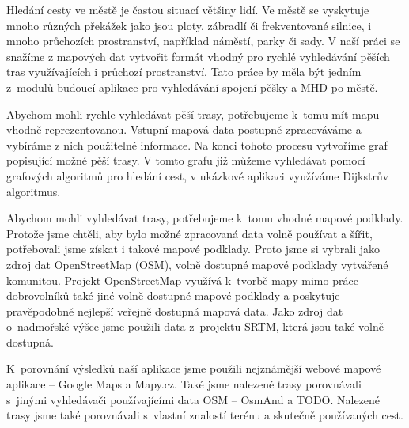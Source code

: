 
Hledání cesty ve městě je častou situací většiny lidí. Ve městě se vyskytuje
mnoho různých překážek jako jsou ploty, zábradlí či frekventované silnice,
i mnoho průchozích prostranství, například náměstí, parky či sady. V naší práci
se snažíme z mapových dat vytvořit formát vhodný pro rychlé vyhledávání pěších
tras využívajících i průchozí prostranství. Tato práce by měla být jedním z~modulů
budoucí aplikace pro vyhledávání spojení pěšky a MHD po městě. 

Abychom mohli rychle vyhledávat pěší trasy, potřebujeme k~tomu mít mapu vhodně
reprezentovanou. Vstupní mapová data postupně zpracováváme a vybíráme z nich
použitelné informace. Na konci tohoto procesu vytvoříme graf popisující možné
pěší trasy. V tomto grafu již můžeme vyhledávat pomocí grafových algoritmů pro
hledání cest, v ukázkové aplikaci využíváme Dijkstrův algoritmus. 

Abychom mohli vyhledávat trasy, potřebujeme k~tomu vhodné mapové podklady.
Protože jsme chtěli, aby bylo možné zpracovaná data volně používat a šířit, 
potřebovali jsme získat i takové mapové podklady. Proto jsme si vybrali jako
zdroj dat OpenStreetMap (OSM), volně dostupné mapové podklady vytvářené komunitou. 
Projekt OpenStreetMap využívá k~tvorbě mapy mimo práce dobrovolníků také jiné
volně dostupné mapové podklady a poskytuje pravěpodobně nejlepší veřejně
dostupná mapová data. Jako zdroj dat o~nadmořské výšce jsme použili data
z~projektu SRTM, která jsou také volně dostupná.

K~porovnání výsledků naší aplikace jsme použili nejznámější webové mapové
aplikace -- Google Maps a Mapy.cz. Také jsme nalezené trasy porovnávali s~jinými
vyhledávači používajícími data OSM -- OsmAnd a TODO. Nalezené trasy jsme také
porovnávali s~vlastní znalostí terénu a skutečně používaných cest.

